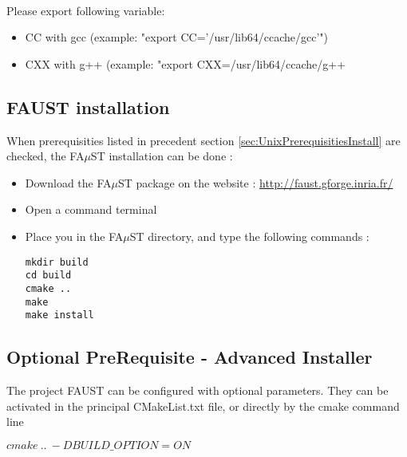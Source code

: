 \paragraph{}Please export following variable:
\begin{itemize}
\item CC with gcc (example: "export CC='/usr/lib64/ccache/gcc'") 
\item CXX with g++ (example: "export CXX=/usr/lib64/ccache/g++
\end{itemize}


\subsection{FAUST installation}\label{sec:UnixFaustInstall}
When prerequisities listed in precedent section \ref{sec:UnixPrerequisitiesInstall} are checked, the FA$\mu$ST installation can be done : 

\begin{itemize}
\item Download the FA$\mu$ST package on the website :  \url{http://faust.gforge.inria.fr/}
\item Open a command terminal
\item Place you in the FA$\mu$ST directory, and type the following commands : 
\begin{lstlisting}
mkdir build
cd build
cmake ..
make
make install
\end{lstlisting}
\end{itemize}

\subsection{Optional PreRequisite - Advanced Installer}\label{sec:UnixOptionalInstall}

The project FAUST can be configured with optional parameters. They can be activated in the principal CMakeList.txt file, or directly by  the cmake command line

$cmake\ ..\ -DBUILD\_OPTION=ON$  

